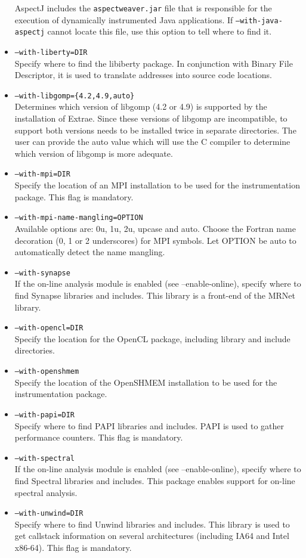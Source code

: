 \begin{itemize}
    AspectJ includes the \texttt{aspectweaver.jar} file that is responsible for the execution of dynamically instrumented Java applications. If \texttt{--with-java-aspectj} cannot locate this file, use this option to tell \TRACE where to find it.
	\item {\tt --with-liberty=DIR} \\
	Specify where to find the libiberty package. In conjunction with Binary File Descriptor, it is used to translate addresses into source code locations.
	\item {\tt --with-libgomp=\{4.2,4.9,auto\}}\\
	Determines which version of libgomp (4.2 or 4.9) is supported by the installation of Extrae. Since these versions of libgomp are incompatible, to support both versions \TRACE needs to be installed twice in separate directories. The user can provide the auto value which will use the C compiler to determine which version of libgomp is more adequate.
	\item {\tt --with-mpi=DIR} \\
	Specify the location of an MPI installation to be used for the instrumentation package. This flag is mandatory.
	\item {\tt --with-mpi-name-mangling=OPTION} \\
	Available options are: 0u, 1u, 2u, upcase and auto. Choose the Fortran name decoration (0, 1 or 2 underscores) for MPI symbols. Let OPTION be auto to automatically detect the name mangling.
        \item {\tt --with-synapse} \\
        If the on-line analysis module is enabled (see --enable-online), specify where to find Synapse libraries and includes. This library is a front-end of the MRNet library. 
	\item {\tt --with-opencl=DIR} \\
	Specify the location for the OpenCL package, including library and include directories.
        \item {\tt --with-openshmem} \\
        Specify the location of the OpenSHMEM installation to be used for the instrumentation package. 
	\item {\tt --with-papi=DIR} \\
	Specify where to find PAPI libraries and includes. PAPI is used to gather performance counters. This flag is mandatory.
        \item {\tt --with-spectral} \\
        If the on-line analysis module is enabled (see --enable-online), specify where to find Spectral libraries and includes. This package enables support for on-line spectral analysis.
	\item {\tt --with-unwind=DIR} \\
	Specify where to find Unwind libraries and includes. This library is used to get callstack information on several architectures (including IA64 and Intel x86-64). This flag is mandatory.
\end{itemize}

